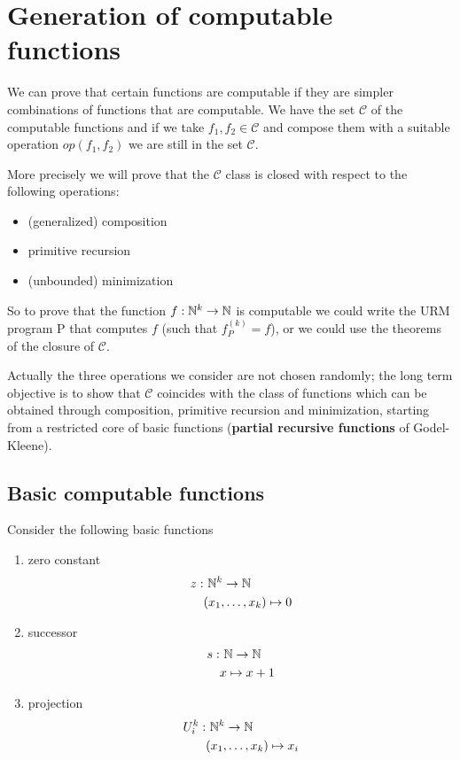 \chapter {Generation of computable functions}

We can prove that certain functions are computable if they are simpler combinations of functions that are computable. 
We have the set $\mathcal{C}$ of the computable functions and if we take $f_1, f_2 \in \mathcal{C}$ and compose them with a suitable operation $ op(f_1, f_2) $ we are still in the set $\mathcal{C}$.

More precisely we will prove that the $\mathcal{C}$ class is closed with respect to the following operations:
\begin{itemize}
\item (generalized) composition 
\item primitive recursion
\item (unbounded) minimization 
\end{itemize}

So to prove that the function $f:\mathbb{N}^k\rightarrow \mathbb{N}$ is computable 
we could write the URM program P that computes $f$ (such that $f_P^{(k)} = f$), 
or we could use the theorems of the closure of $\mathcal{C}$.

Actually the three operations we consider are not chosen randomly; 
the long term objective is to show that $\mathcal{C}$ coincides with the class of functions which can be obtained
through composition, primitive recursion and minimization, 
starting from a restricted core of basic functions (\textbf{partial recursive functions} of Godel-Kleene).

\section {Basic computable functions}
Consider the following basic functions
\begin{enumerate}
\item zero constant 
      \begin{align*}
        z: &\ \mathbb{N}^k \rightarrow \mathbb{N}\\
           & (x_1,\dots, x_k) \mapsto 0
      \end{align*}
\item successor 
      \begin{align*}
        s: &\ \mathbb{N} \rightarrow \mathbb{N}\\
        & x \mapsto x + 1
      \end{align*}
\item projection 
      \begin{align*}
        U_i^k: &\ \mathbb{N}^k \rightarrow \mathbb{N}\\
        & (x_1,\dots, x_k) \mapsto x_i
      \end{align*}
      
\end{enumerate}

